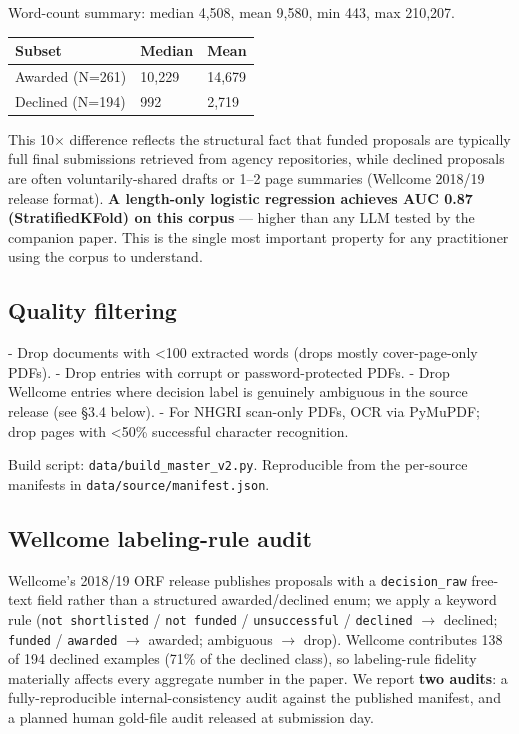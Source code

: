 \documentclass[11pt]{article}
\begin{document}
Word-count summary: median 4,508, mean 9,580, min 443, max 210,207.

\begin{table}[H]
\centering
\small
\begin{tabular}{lll}
\toprule
Subset & Median & Mean \\
\midrule
Awarded (N=261) & 10,229 & 14,679 \\
Declined (N=194) & 992 & 2,719 \\
\bottomrule
\end{tabular}
\end{table}

This 10$\times$ difference reflects the structural fact that funded proposals are typically full final submissions retrieved from agency repositories, while declined proposals are often voluntarily-shared drafts or 1--2 page summaries (Wellcome 2018/19 release format). \textbf{A length-only logistic regression achieves AUC 0.87 (StratifiedKFold) on this corpus} --- higher than any LLM tested by the companion paper. This is the single most important property for any practitioner using the corpus to understand.

\subsection{Quality filtering}

- Drop documents with <100 extracted words (drops mostly cover-page-only PDFs).
- Drop entries with corrupt or password-protected PDFs.
- Drop Wellcome entries where decision label is genuinely ambiguous in the source release (see §3.4 below).
- For NHGRI scan-only PDFs, OCR via PyMuPDF; drop pages with <50\% successful character recognition.

Build script: \texttt{data/build\_master\_v2.py}. Reproducible from the per-source manifests in \texttt{data/{source}/manifest.json}.

\subsection{Wellcome labeling-rule audit}

Wellcome's 2018/19 ORF release publishes proposals with a \texttt{decision\_raw} free-text field rather than a structured awarded/declined enum; we apply a keyword rule (\texttt{not shortlisted} / \texttt{not funded} / \texttt{unsuccessful} / \texttt{declined} $\rightarrow$ declined; \texttt{funded} / \texttt{awarded} $\rightarrow$ awarded; ambiguous $\rightarrow$ drop). Wellcome contributes 138 of 194 declined examples (71\% of the declined class), so labeling-rule fidelity materially affects every aggregate number in the paper. We report \textbf{two audits}: a fully-reproducible internal-consistency audit against the published manifest, and a planned human gold-file audit released at submission day.
\end{document}
